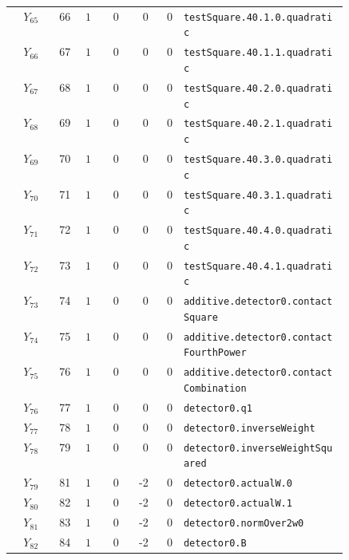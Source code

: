 {\begin{longtable}{@{}r r c r r r p{0.49\linewidth}@{}}
\(Y_{65}\) & 66 & \(1\) & 0 & 0 & 0 & \texttt{testSquare.\allowbreak{}40.\allowbreak{}1.\allowbreak{}0.\allowbreak{}quadratic} \\
\(Y_{66}\) & 67 & \(1\) & 0 & 0 & 0 & \texttt{testSquare.\allowbreak{}40.\allowbreak{}1.\allowbreak{}1.\allowbreak{}quadratic} \\
\(Y_{67}\) & 68 & \(1\) & 0 & 0 & 0 & \texttt{testSquare.\allowbreak{}40.\allowbreak{}2.\allowbreak{}0.\allowbreak{}quadratic} \\
\(Y_{68}\) & 69 & \(1\) & 0 & 0 & 0 & \texttt{testSquare.\allowbreak{}40.\allowbreak{}2.\allowbreak{}1.\allowbreak{}quadratic} \\
\(Y_{69}\) & 70 & \(1\) & 0 & 0 & 0 & \texttt{testSquare.\allowbreak{}40.\allowbreak{}3.\allowbreak{}0.\allowbreak{}quadratic} \\
\(Y_{70}\) & 71 & \(1\) & 0 & 0 & 0 & \texttt{testSquare.\allowbreak{}40.\allowbreak{}3.\allowbreak{}1.\allowbreak{}quadratic} \\
\(Y_{71}\) & 72 & \(1\) & 0 & 0 & 0 & \texttt{testSquare.\allowbreak{}40.\allowbreak{}4.\allowbreak{}0.\allowbreak{}quadratic} \\
\(Y_{72}\) & 73 & \(1\) & 0 & 0 & 0 & \texttt{testSquare.\allowbreak{}40.\allowbreak{}4.\allowbreak{}1.\allowbreak{}quadratic} \\
\(Y_{73}\) & 74 & \(1\) & 0 & 0 & 0 & \texttt{additive.\allowbreak{}detector0.\allowbreak{}contactSquare} \\
\(Y_{74}\) & 75 & \(1\) & 0 & 0 & 0 & \texttt{additive.\allowbreak{}detector0.\allowbreak{}contactFourthPower} \\
\(Y_{75}\) & 76 & \(1\) & 0 & 0 & 0 & \texttt{additive.\allowbreak{}detector0.\allowbreak{}contactCombination} \\
\(Y_{76}\) & 77 & \(1\) & 0 & 0 & 0 & \texttt{detector0.\allowbreak{}q1} \\
\(Y_{77}\) & 78 & \(1\) & 0 & 0 & 0 & \texttt{detector0.\allowbreak{}inverseWeight} \\
\(Y_{78}\) & 79 & \(1\) & 0 & 0 & 0 & \texttt{detector0.\allowbreak{}inverseWeightSquared} \\
\(Y_{79}\) & 81 & \(1\) & 0 & -2 & 0 & \texttt{detector0.\allowbreak{}actualW.\allowbreak{}0} \\
\(Y_{80}\) & 82 & \(1\) & 0 & -2 & 0 & \texttt{detector0.\allowbreak{}actualW.\allowbreak{}1} \\
\(Y_{81}\) & 83 & \(1\) & 0 & -2 & 0 & \texttt{detector0.\allowbreak{}normOver2w0} \\
\(Y_{82}\) & 84 & \(1\) & 0 & -2 & 0 & \texttt{detector0.\allowbreak{}B} \\

\end{longtable}}
